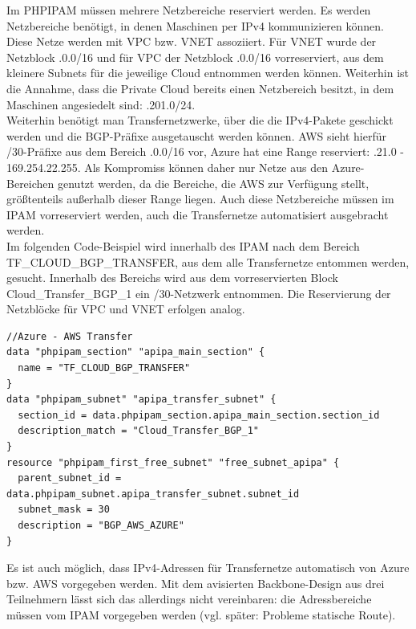 Im PHPIPAM müssen mehrere Netzbereiche reserviert werden. Es werden Netzbereiche benötigt, in denen Maschinen per IPv4 kommunizieren können. Diese Netze werden mit VPC bzw. VNET assoziiert. Für VNET wurde der Netzblock .0.0/16\grqq{} und für VPC der Netzblock .0.0/16\grqq{} vorreserviert, aus dem kleinere Subnets für die jeweilige Cloud entnommen werden können. Weiterhin ist die Annahme, dass die Private Cloud bereits einen Netzbereich besitzt, in dem Maschinen angesiedelt sind: .201.0/24.\grqq{}\\
Weiterhin benötigt man {Transfernetzwerke}, über die die IPv4-Pakete geschickt werden und die BGP-Präfixe ausgetauscht werden können. AWS sieht hierfür /30-Präfixe aus dem Bereich .0.0/16\grqq{} vor, Azure hat eine Range reserviert: .21.0 - 169.254.22.255\grqq{}. Als Kompromiss können daher nur Netze aus den Azure-Bereichen genutzt werden, da die Bereiche, die AWS zur Verfügung stellt, größtenteils außerhalb dieser Range liegen. Auch diese Netzbereiche müssen im IPAM vorreserviert werden, auch die Transfernetze automatisiert ausgebracht werden.\\
Im folgenden Code-Beispiel wird innerhalb des IPAM nach dem Bereich \glqq TF\_CLOUD\_BGP\_TRANSFER\grqq{}, aus dem alle Transfernetze entommen werden, gesucht. Innerhalb des Bereichs wird aus dem vorreservierten Block \glqq Cloud\_Transfer\_BGP\_1\grqq{} ein /30-Netzwerk entnommen. Die Reservierung der Netzblöcke für VPC und VNET erfolgen analog.
\FloatBarrier
\begin{lstlisting}[float,label=network-reservation-ip,caption=Die data-Anweisungen dienen ausschließlich der Suche nach dem passenden Transfernetzwerk-Block. Per resource-Anweisung wird ein /30-Netzwerk reserviert.]
//Azure - AWS Transfer
data "phpipam_section" "apipa_main_section" {
  name = "TF_CLOUD_BGP_TRANSFER"
}
data "phpipam_subnet" "apipa_transfer_subnet" {
  section_id = data.phpipam_section.apipa_main_section.section_id
  description_match = "Cloud_Transfer_BGP_1"
} 
resource "phpipam_first_free_subnet" "free_subnet_apipa" {
  parent_subnet_id = data.phpipam_subnet.apipa_transfer_subnet.subnet_id
  subnet_mask = 30
  description = "BGP_AWS_AZURE"
}
\end{lstlisting}
\FloatBarrier
Es ist auch möglich, dass IPv4-Adressen für Transfernetze automatisch von Azure bzw. AWS vorgegeben werden. Mit dem avisierten Backbone-Design aus drei Teilnehmern lässt sich das allerdings nicht vereinbaren: die Adressbereiche müssen vom IPAM vorgegeben werden (vgl. später: Probleme statische Route).\\
